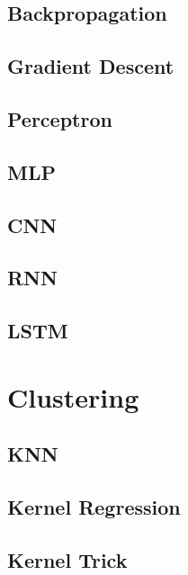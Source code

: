 \documentclass[18pt,a3paper,landscape, ncols=3]{cheatsheet}
\begin{document}
	\subsection{Backpropagation}
		\begin{mdframed}
		\end{mdframed}
	\subsection{Gradient Descent}
		\begin{mdframed}
		\end{mdframed}
	\subsection{Perceptron}
		\begin{mdframed}
		\end{mdframed}
	\subsection{MLP}
		\begin{mdframed}
		\end{mdframed}
	\subsection{CNN}
		\begin{mdframed}
		\end{mdframed}
	\subsection{RNN}
		\begin{mdframed}
		\end{mdframed}
	\subsection{LSTM}
		\begin{mdframed}
		\end{mdframed}

\section{Clustering} \seperator %
	\subsection{KNN}
		\begin{mdframed}
		\end{mdframed}
	\subsection{Kernel Regression}
		\begin{mdframed}
		\end{mdframed}
	\subsection{Kernel Trick}
		\begin{mdframed}
		\end{mdframed}

\end{document}
